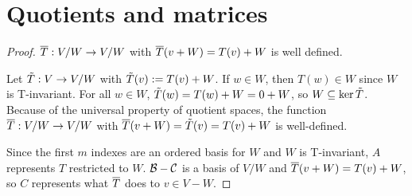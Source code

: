 \section{Quotients and matrices}
\begin{proof}$\overline{T}: V/W \rightarrow V/W$ with $\overline{T}(v+W) = T(v) + W$ is well defined. \gap
    
    Let $\tilde{T}: V \rightarrow V/W$ with $\tilde{T}(v) := T(v) + W$.
    If $w \in W$, then $T(w) \in W$ since $W$ is T-invariant.
    For all $w \in W$, $\tilde{T}(w) = T(w) + W = 0 + W$, so $W \subseteq \ker \tilde{T}$.
    Because of the universal property of quotient spaces,
    the function $\overline{T}: V/W \rightarrow V/W$ with 
    $\overline{T}(v+W) = \tilde{T}(v) = T(v) + W$ is well-defined.\gap

    Since the first $m$ indexes are an ordered basis for $W$
    and $W$ is T-invariant, $A$ represents $T$ restricted to $W$.
    $\mathcal{B} - \mathcal{C}$ is a basis of $V/W$ and 
    $\overline{T}(v+W) = T(v) + W$, so
    $C$ represents what $\overline{T}$ does to $v \in V-W$.
\end{proof}